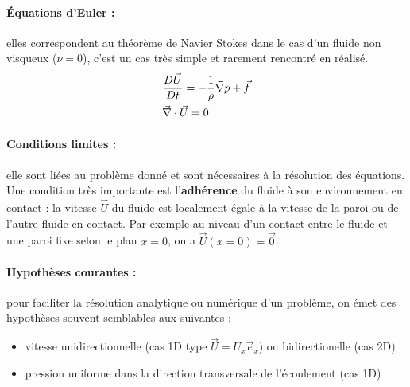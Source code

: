 \paragraph{Équations d'Euler :}elles correspondent au théorème de Navier Stokes dans le cas d'un fluide non visqueux ($\nu=0$), c'est un cas très simple et rarement rencontré en réalisé.
%
\begin{align}[left=\empheqlbrace]
    & \frac{D\vec{U}}{Dt} = - \frac{1}{\rho} \vec{\nabla} p + \vec{f} \\
    \notag & \vec{\nabla} \cdot \vec{U} = 0
\end{align}

\paragraph{Conditions limites :}elle sont liées au problème donné et sont nécessaires à la résolution des équations. Une condition très importante est l'\textbf{adhérence} du fluide à son environnement en contact : la vitesse $\vec{U}$ du fluide est localement égale à la vitesse de la paroi ou de l'autre fluide en contact. Par exemple au niveau d'un contact entre le fluide et une paroi fixe selon le plan $x = 0$, on a $\vec{U}(x=0) = \vec{0}$.

\paragraph{Hypothèses courantes :}pour faciliter la résolution analytique ou numérique d'un problème, on émet des hypothèses souvent semblables aux suivantes :
%
\begin{itemize}
    \item vitesse unidirectionnelle (cas 1D type $\vec{U} = U_x \vec{e}_x$) ou bidirectionelle (cas 2D)
    \item pression uniforme dans la direction transversale de l'écoulement (cas 1D)
\end{itemize}


